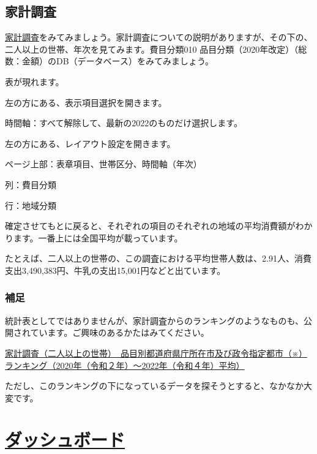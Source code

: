 \documentclass[
  xelatex, ja=standard]{bxjsbook}
\theoremstyle{definition}
\theoremstyle{definition}
\theoremstyle{definition}
\theoremstyle{definition}
\theoremstyle{remark}
\begin{document}
\hypertarget{ux5bb6ux8a08ux8abfux67fb}{%
\subsection{家計調査}\label{ux5bb6ux8a08ux8abfux67fb}}

\href{https://www.e-stat.go.jp/stat-search/database?page=1\&toukei=00200561\&tstat=000000330001\&toukei_kind=6\&metadata=1\&data=1}{家計調査}をみてみましょう。家計調査についての説明がありますが、その下の、二人以上の世帯、年次を見てみます。費目分類010 品目分類（2020年改定）（総数：金額）のDB（データベース）をみてみましょう。

表が現れます。

左の方にある、表示項目選択を開きます。

時間軸：すべて解除して、最新の2022のものだけ選択します。

左の方にある、レイアウト設定を開きます。

ページ上部：表章項目、世帯区分、時間軸（年次）

列：費目分類

行：地域分類

確定させてもとに戻ると、それぞれの項目のそれぞれの地域の平均消費額がわかります。一番上には全国平均が載っています。

たとえば、二人以上の世帯の、この調査における平均世帯人数は、2.91人、消費支出3,490,383円、牛乳の支出15,001円などと出ています。

\hypertarget{ux88dcux8db3}{%
\subsubsection{補足}\label{ux88dcux8db3}}

統計表としてではありませんが、家計調査からのランキングのようなものも、公開されています。ご興味のあるかたはみてください。

\href{https://www.stat.go.jp/data/kakei/5.html}{家計調査（二人以上の世帯）　品目別都道府県庁所在市及び政令指定都市（※）ランキング（2020年（令和２年）～2022年（令和４年）平均）}

ただし、このランキングの下になっているデータを探そうとすると、なかなか大変です。

\hypertarget{ux30c0ux30c3ux30b7ux30e5ux30dcux30fcux30c9-4}{%
\section{\texorpdfstring{\href{https://dashboard.e-stat.go.jp}{ダッシュボード}}{ダッシュボード}}\label{ux30c0ux30c3ux30b7ux30e5ux30dcux30fcux30c9-4}}
\end{document}
